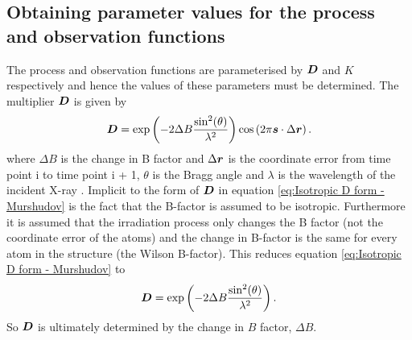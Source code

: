 \subsection{Obtaining parameter values for the process and observation functions}
\label{sub:Obtaining parameter values for the process and observation functions}
The process and observation functions are parameterised by $\boldsymbol{D}$ and $K$ respectively and hence the values of these parameters must be determined.
The multiplier $\boldsymbol{D}$ is given by \cite{murshudov1997refinement,leal2012}
\begin{equation}
    \boldsymbol{D} = \exp \left( -2\Delta B \frac{\sin^2(\theta)}{\lambda^2} \right) \cos \left( 2 \pi \boldsymbol{s} \cdot \Delta \boldsymbol{r} \right).
    \label{eq:Isotropic D form - Murshudov}
\end{equation}
where $\Delta B$ is the change in B factor and $\Delta \boldsymbol{r}$ is the coordinate error from time point i to time point i + 1, $\theta$ is the Bragg angle and $\lambda$ is the wavelength of the incident X-ray .
Implicit to the form of $\boldsymbol{D}$ in equation \ref{eq:Isotropic D form - Murshudov} is the fact that the B-factor is assumed to be isotropic.
Furthermore it is assumed that the irradiation process only changes the B factor (not the coordinate error of the atoms) and the change in B-factor is the same for every atom in the structure (the Wilson B-factor).
This reduces equation \ref{eq:Isotropic D form - Murshudov} to
\begin{equation}
    \boldsymbol{D} = \exp \left( -2\Delta B \frac{\sin^2(\theta)}{\lambda^2} \right).
    \label{eq:Reduced D form}
\end{equation}
So $\boldsymbol{D}$ is ultimately determined by the change in $B$ factor, $\Delta B$.

